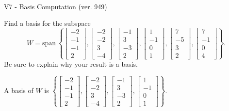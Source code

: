 \begin{exercise}
  \begin{exerciseTitle}V7 - Basis Computation (ver. 949)\end{exerciseTitle}
  \begin{exerciseStatement}
    Find a basis for the subspace 
\[W=\mathrm{span}\ \left\{\left[\begin{array}{r}
-2 \\
-1 \\
-1 \\
2
\end{array}\right] , \left[\begin{array}{r}
-2 \\
-2 \\
3 \\
-4
\end{array}\right] , \left[\begin{array}{r}
-1 \\
3 \\
-3 \\
2
\end{array}\right] , \left[\begin{array}{r}
1 \\
-1 \\
0 \\
1
\end{array}\right] , \left[\begin{array}{r}
7 \\
-5 \\
3 \\
2
\end{array}\right] , \left[\begin{array}{r}
7 \\
-1 \\
0 \\
4
\end{array}\right]\right\}.\]
 Be sure to explain why your result is a basis.


  \end{exerciseStatement}
  \begin{exerciseAnswer}
   A basis of \(W\) is  \(\left\{\left[\begin{array}{r}
-2 \\
-1 \\
-1 \\
2
\end{array}\right] , \left[\begin{array}{r}
-2 \\
-2 \\
3 \\
-4
\end{array}\right] , \left[\begin{array}{r}
-1 \\
3 \\
-3 \\
2
\end{array}\right] , \left[\begin{array}{r}
1 \\
-1 \\
0 \\
1
\end{array}\right]\right\}\).
  


  \end{exerciseAnswer}
\end{exercise}